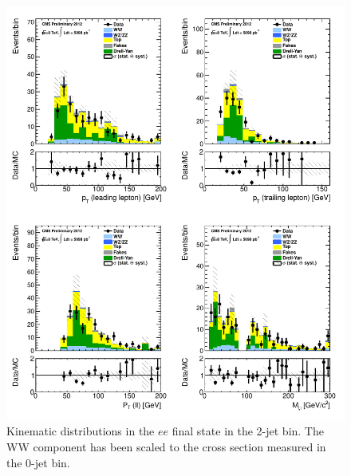 \begin{figure}[!hbtp]
\centering
\includegraphics[width=1\textwidth]{figures/ww_analysis20_0_ALL_ee_2j.pdf} %
\caption{Kinematic distributions in the $ee$ final state in the 2-jet bin.
The WW component has been scaled to the cross section measured in the 0-jet bin.}
\label{fig:xs_kinematics_ee_2j}
\end{figure}
